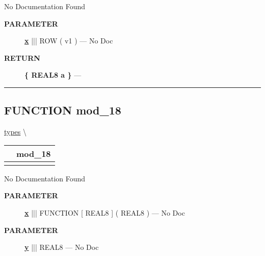 No Documentation Found






\par
\begin{description}
\item [\colorbox{tagtype}{\color{white} \textbf{\textsf{PARAMETER}}}] \textbf{\underline{x}} ||| ROW ( v1 ) --- No Doc
\end{description}







\par
\begin{description}
\item [\colorbox{tagtype}{\color{white} \textbf{\textsf{RETURN}}}] \textbf{\{ REAL8 a \}} --- 
\end{description}




\rule{\linewidth}{0.5pt}
\subsection*{\textsf{\colorbox{headtoc}{\color{white} FUNCTION}
mod\_18}}

\hypertarget{ecldoc:types.mod_18}{}
\hspace{0pt} \hyperlink{ecldoc:types}{types} \textbackslash 

{\renewcommand{\arraystretch}{1.5}
\begin{tabularx}{\textwidth}{|>{\raggedright\arraybackslash}l|X|}
\hline
\hspace{0pt}\mytexttt{\color{red} } & \textbf{mod\_18} \\
\hline
\multicolumn{2}{|>{\raggedright\arraybackslash}X|}{\hspace{0pt}\mytexttt{\color{param} (REAL8 x(REAL8 z), REAL8 y)}} \\
\hline
\end{tabularx}
}

\par





No Documentation Found






\par
\begin{description}
\item [\colorbox{tagtype}{\color{white} \textbf{\textsf{PARAMETER}}}] \textbf{\underline{x}} ||| FUNCTION [ REAL8 ] ( REAL8 ) --- No Doc
\item [\colorbox{tagtype}{\color{white} \textbf{\textsf{PARAMETER}}}] \textbf{\underline{y}} ||| REAL8 --- No Doc
\end{description}







